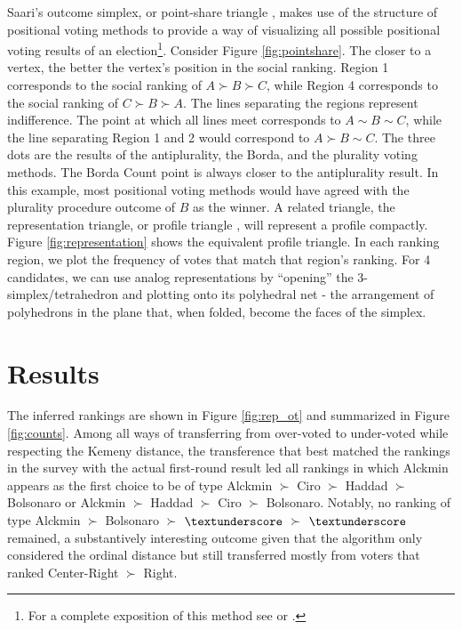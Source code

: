 \documentclass[hidelinks,11pt]{article} \usepackage[utf8]{inputenc}
\begin{document}

Saari's outcome simplex, or point-share triangle \parencite{eggers20_diagr_analy_ordin_votin_system}, makes use of the structure of positional voting methods to provide a way of visualizing all possible positional voting results of an election\footnote{For a complete exposition of
  this method see \textcite{saari1995basic} or \textcite{nurmi2002voting}.}. Consider Figure \ref{fig:pointshare}. The closer to a vertex, the better the vertex's position in the social ranking. Region 1 corresponds to the social ranking of \(A \succ B \succ C\), while Region 4 corresponds to the social ranking of \(C\succ B\succ A\). The lines separating the regions represent indifference. The point at which all lines meet corresponds to \(A \sim B \sim C\), while the line separating Region 1 and 2 would correspond to \(A \succ B \sim C\). The three dots are the results of the antiplurality, the Borda, and the plurality voting methods. The Borda Count point is always closer to the antiplurality result. In this example, most positional voting methods would have agreed with the plurality procedure outcome of \(B\) as the winner. A related triangle, the representation triangle, or profile triangle \parencite{eggers20_diagr_analy_ordin_votin_system}, will represent a profile compactly. Figure \ref{fig:representation} shows the equivalent profile triangle. In each ranking region, we plot the frequency of votes that match that region's ranking. For 4 candidates, we can use analog representations by ``opening'' the 3-simplex/tetrahedron and plotting onto its polyhedral net - the arrangement of polyhedrons in the plane that, when folded, become the faces of the simplex.

\section{Results}

The inferred rankings are shown in Figure \ref{fig:rep_ot} and summarized in Figure \ref{fig:counts}. Among all ways of transferring from over-voted to under-voted while respecting the Kemeny distance, the transference that best matched the rankings in the survey with the actual first-round result led all rankings in which Alckmin appears as the first choice to be of type Alckmin \(\succ\) Ciro \(\succ\) Haddad \(\succ\) Bolsonaro or Alckmin \(\succ\) Haddad \(\succ\) Ciro \(\succ\) Bolsonaro.  Notably, no ranking of type Alckmin \(\succ\) Bolsonaro \(\succ\) \(\textunderscore\) \(\succ\) \(\textunderscore\) remained, a substantively interesting outcome given that the algorithm only considered the ordinal distance but still transferred mostly from voters that ranked Center-Right \(\succ\) Right.
\end{document}
